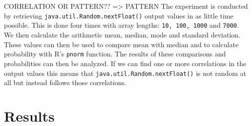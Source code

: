 \documentclass[
10pt, %
a4paper, %
oneside, %
headinclude,footinclude, %
BCOR5mm, %
]{scrartcl}
\begin{document}
\\
\\
CORRELATION OR PATTERN?? => PATTERN
The experiment is conducted by retrieving \texttt{java.util.Random.nextFloat()} output values in as little time possible. This is done four times with array lengths: \texttt{10, 100, 1000} and \texttt{7000}. We then calculate the arithmetic mean, median, mode and standard deviation. These values can then be used to compare mean with median and to calculate probability with R's \texttt{pnorm} function. The results of these comparisons and probabilities can then be analyzed. If we can find one or more correlations in the output values this means that \texttt{java.util.Random.nextFloat()} is not random at all but instead follows those correlations.


\section{Results}
\end{document}
